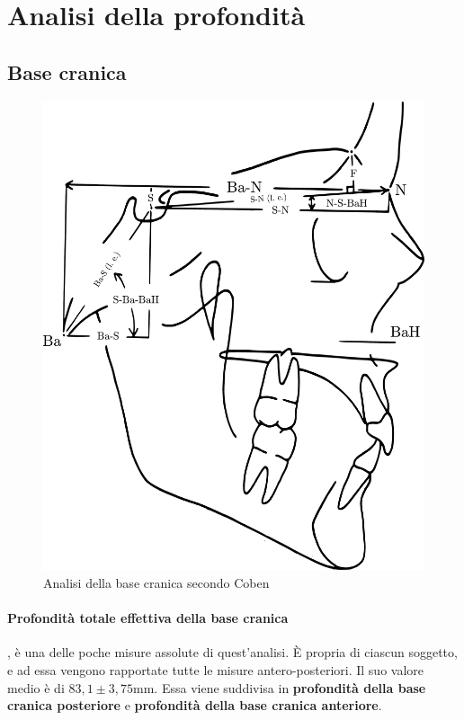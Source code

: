 \section{Analisi della profondità}

\subsection*{Base cranica}
\begin{figure}
\centering
\includegraphics[width=.6\columnwidth]{./images/coben_base_cranica.pdf}
\caption{Analisi della base cranica secondo Coben}
\label{fig:coben_base_cranica}
\end{figure}

\paragraph{Profondità totale effettiva della base cranica} , è una delle poche misure assolute di quest'analisi. È propria di ciascun soggetto, e ad essa vengono rapportate tutte le misure antero-posteriori. Il suo valore medio è di $83,1 \pm 3,75$mm. Essa viene suddivisa in \textbf{profondità della base cranica posteriore} e \textbf{profondità della base cranica anteriore}.


